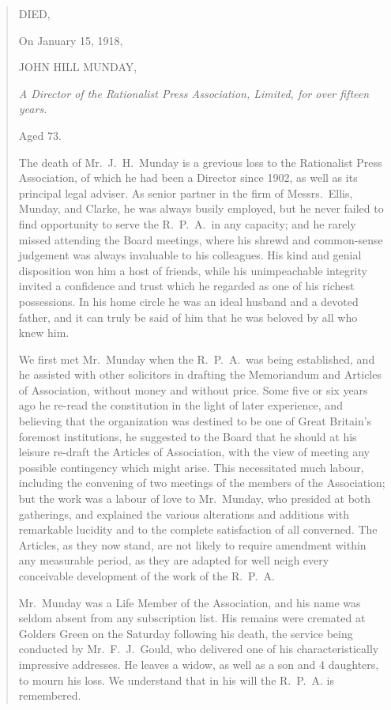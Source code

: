\begin{quotation}
\begin{center}
DIED,

On January 15, 1918,

JOHN HILL MUNDAY,

\emph{A Director of the Rationalist Press Association, Limited, for over fifteen years.}

Aged 73.
\end{center}

The death of Mr.\ J.\ H.\ Munday is a grevious loss to the Rationalist Press Association, of which he had been a Director since 1902, as well as its principal legal adviser. As senior partner in the firm of Messrs.\ Ellis, Munday, and Clarke, he was always busily employed, but he never failed to find opportunity to serve the R.~P.~A.~in any capacity; and he rarely missed attending the Board meetings, where his shrewd and common-sense judgement was always invaluable to his colleagues. His kind and genial disposition won him a host of friends, while his unimpeachable integrity invited a confidence and trust which he regarded as one of his richest possessions. In his home circle he was an ideal husband and a devoted father, and it can truly be said of him that he was beloved by all who knew him.

We first met Mr.\ Munday when the R.~P.~A.~was being established, and he assisted with other solicitors in drafting the Memoriandum and Articles of Association, without money and without price. Some five or six years ago he re-read the constitution in the light of later experience, and believing that the organization was destined to be one of Great Britain's foremost institutions, he suggested to the Board that he should at his leisure re-draft the Articles of Association, with the view of meeting any possible contingency which might arise. This necessitated much labour, including the convening of two meetings of the members of the Association; but the work was a labour of love to Mr.\ Munday, who presided at both gatherings, and explained the various alterations and additions with remarkable lucidity and to the complete satisfaction of all converned. The Articles, as they now stand, are not likely to require amendment within any measurable period, as they are adapted for well neigh every conceivable development of the work of the R.~P.~A.

Mr.\ Munday was a Life Member of the Association, and his name was seldom absent from any subscription list. His remains were cremated at Golders Green on the Saturday following his death, the service being conducted by Mr.~F.~J.~Gould, who delivered one of his characteristically impressive addresses. He leaves a widow, as well as a son and 4 daughters, to mourn his loss. We understand that in his will the R.~P.~A. is remembered.
\end{quotation}

